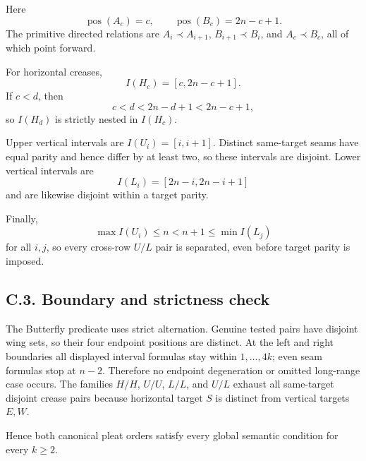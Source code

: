 \documentclass[11pt]{article}
\theoremstyle{definition}
\theoremstyle{remark}
\begin{document}
Here \[
\operatorname{pos}(A_c)=c,\qquad
\operatorname{pos}(B_c)=2n-c+1.
\] The primitive directed relations are \(A_i\prec A_{i+1}\),
\(B_{i+1}\prec B_i\), and \(A_c\prec B_c\), all of which point forward.

For horizontal creases, \[
I(H_c)=[c,2n-c+1].
\] If \(c<d\), then \[
c<d<2n-d+1<2n-c+1,
\] so \(I(H_d)\) is strictly nested in \(I(H_c)\).

Upper vertical intervals are \(I(U_i)=[i,i+1]\). Distinct same-target
seams have equal parity and hence differ by at least two, so these
intervals are disjoint. Lower vertical intervals are \[
I(L_i)=[2n-i,2n-i+1]
\] and are likewise disjoint within a target parity.

Finally, \[
\max I(U_i)\le n<n+1\le\min I(L_j)
\] for all \(i,j\), so every cross-row \(U/L\) pair is separated, even
before target parity is imposed.

\subsection{C.3. Boundary and strictness
check}\label{c.3.-boundary-and-strictness-check}

The Butterfly predicate uses strict alternation. Genuine tested pairs
have disjoint wing sets, so their four endpoint positions are distinct.
At the left and right boundaries all displayed interval formulas stay
within \(1,\ldots,4k\); even seam formulas stop at \(n-2\). Therefore no
endpoint degeneration or omitted long-range case occurs. The families
\(H/H\), \(U/U\), \(L/L\), and \(U/L\) exhaust all same-target disjoint
crease pairs because horizontal target \(S\) is distinct from vertical
targets \(E,W\).

Hence both canonical pleat orders satisfy every global semantic
condition for every \(k\ge2\).
\end{document}
